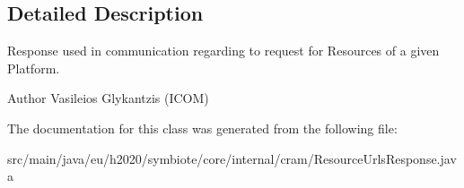 \subsection{Detailed Description}
Response used in communication regarding to request for Resources of a given Platform.

\begin{DoxyAuthor}{Author}
Vasileios Glykantzis (I\+C\+OM) 
\end{DoxyAuthor}


The documentation for this class was generated from the following file\+:\begin{DoxyCompactItemize}
\item 
src/main/java/eu/h2020/symbiote/core/internal/cram/Resource\+Urls\+Response.\+java\end{DoxyCompactItemize}
